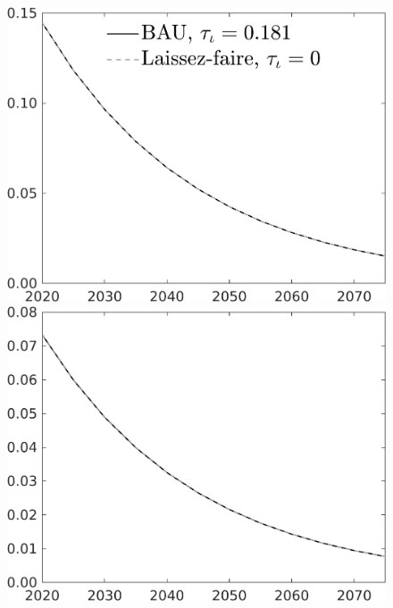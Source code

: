 \documentclass[12pt]{article}
\begin{document}
\begin{figure}[h!!]
\begin{minipage}[]{0.32\textwidth}
\end{minipage}	
	\begin{minipage}[]{0.32\textwidth}
		\includegraphics[width=1\textwidth]{../../codding_model/own_basedOnFried/optimalPol_010922_revision/figures/all_13Sept22/CompTaul_Equlab_LFBAU_Reg0_pf_spillover0_nsk0_xgr1_knspil1_sep1_countec0_GovRev0_etaa0.79_lgd1.png}
	\end{minipage}	
	\begin{minipage}[]{0.32\textwidth}
		\includegraphics[width=1\textwidth]{../../codding_model/own_basedOnFried/optimalPol_010922_revision/figures/all_13Sept22/CompTaul_Equlab_LFBAU_Reg0_pee_spillover0_nsk0_xgr1_knspil1_sep1_countec0_GovRev0_etaa0.79_lgd0.png}

\end{minipage}
\end{figure}
\end{document}
